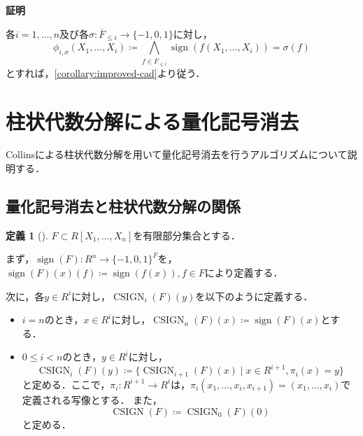 \documentclass[uplatex, dvipdfmx]{jsarticle}
\makeatletter
\numberwithin{equation}{section}
\renewenvironment{proof}[1][\proofname]{\par
  \pushQED{\qed}%
  \normalfont \topsep6\p@\@plus6\p@\relax
  \trivlist
  \item\relax
  {\bfseries
  #1\@addpunct{.}}\hspace\labelsep\ignorespaces
}{
  \popQED\endtrivlist\@endpefalse
}
\newcommand{\map}[3]{{#1}\colon{#2}\rightarrow{#3}}
\DeclareMathOperator{\sign}{sign}
\DeclareMathOperator{\CSIGN}{CSIGN}
\theoremstyle{definition}
\newtheorem{definition}{定義}[section]
\renewcommand{\proofname}{\textbf{証明}}
\makeatother
\begin{document}
\begin{proof}
     各$i=1, \dots, n$及び各$\map{\sigma}{\overline{F}_{\leq i}}{\{-1,0,1\}}$に対し，
     \begin{equation}
          \phi_{i, \sigma}(X_1, \dots, X_i) \coloneqq \bigwedge_{f \in \overline{F}_{\leq i}}\sign(f(X_1, \dots, X_i)) = \sigma(f)
     \end{equation}
     とすれば，\cref{corollary:improved-cad}より従う．
\end{proof}


\section{柱状代数分解による量化記号消去}

Collins\cite{MR0403962}による柱状代数分解を用いて量化記号消去を行うアルゴリズムについて説明する．

\subsection{量化記号消去と柱状代数分解の関係}
\begin{definition}[{\cite[Notation 11.7]{MR2248869}}]
     $F \subset R[X_1, \dots, X_n]$を有限部分集合とする．

     まず，$\map{\sign(F)}{R^n}{\{-1, 0, 1\}^F}$を，
     $\sign(F)(x)(f)\coloneqq \sign(f(x)), f \in F$により定義する．

     次に，各$y \in R^i$に対し，$\CSIGN_i(F)(y)$を以下のように定義する．
     \begin{itemize}
          \item $i=n$のとき，$x \in R^i$に対し，$\CSIGN_n(F)(x)\coloneqq \sign(F)(x) $とする．
          \item $0 \leq i<n$のとき，$y \in R^i$に対し，
          \begin{equation}
               \CSIGN_i(F)(y) \coloneqq \{\CSIGN_{i+1}(F)(x) \mid x \in  R^{i+1}, \pi_i(x) = y\}
          \end{equation}
          と定める．ここで，$\map{\pi_i}{R^{i+1}}{R^i}$は，$\pi_i(x_1, \dots, x_i, x_{i+1}) = (x_1, \dots, x_i)$で定義される写像とする．
          また，
          \begin{equation}
               \CSIGN(F) \coloneqq \CSIGN_0(F)(0)
          \end{equation}
          と定める．
     \end{itemize}
\end{definition}
\end{document}
